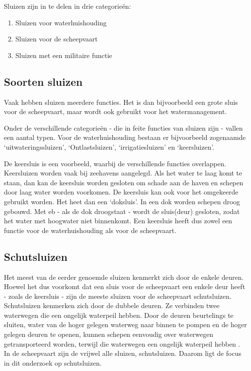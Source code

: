 \documentclass{article} %
\begin{document}
Sluizen zijn in te delen in drie categorieën:
\begin{enumerate}
    \item Sluizen voor waterhuishouding
    \item Sluizen voor de scheepvaart
    \item Sluizen met een militaire functie
\end{enumerate}

\subsection{Soorten sluizen}
Vaak hebben sluizen meerdere functies. Het is dan bijvoorbeeld een grote sluis voor de scheepvaart, maar wordt ook gebruikt voor het watermanagement.\par

Onder de verschillende categorieën - die in feite functies van sluizen zijn - vallen een aantal typen. Voor de waterhuishouding bestaan er bijvoorbeeld zogenaamde ‘uitwateringssluizen’, ‘Ontlastsluizen’, ‘irrigatiesluizen’ en ‘keersluizen’. \par

De keersluis is een voorbeeld, waarbij de verschillende functies overlappen. Keersluizen worden vaak bij zeehavens aangelegd. Als het water te laag komt te staan, dan kan de keersluis worden gesloten om schade aan de haven en schepen door laag water worden voorkomen. De keersluis kan ook voor het omgekeerde gebruikt worden. Het heet dan een ‘doksluis’. In een dok worden schepen droog gebouwd. Met eb - als de dok droogstaat - wordt de sluis(deur) gesloten, zodat het water met hoogwater niet binnenkomt. Een keersluis heeft dus zowel een functie voor de waterhuishouding als voor de scheepvaart. \par

\subsection{Schutsluizen}
Het meest van de eerder genoemde sluizen kenmerkt zich door de enkele deuren. Hoewel het dus voorkomt dat een sluis voor de scheepvaart een enkele deur heeft - zoals de keersluis - zijn de meeste sluizen voor de scheepvaart schutsluizen. Schutsluizen kenmerken zich door de dubbele deuren. Ze verbinden twee waterwegen die een ongelijk waterpeil hebben. Door de deuren beurtelings te sluiten, water van de hoger gelegen waterweg naar binnen te pompen en de hoger gelegen deuren te openen, kunnen schepen eenvoudig over waterwegen getransporteerd worden, terwijl die waterwegen een ongelijk waterpeil hebben \cite{Arends1994}. \\
In de scheepvaart zijn de vrijwel alle sluizen, schutsluizen. Daarom ligt de focus in dit onderzoek op schutsluizen.
\newpage
\end{document}
